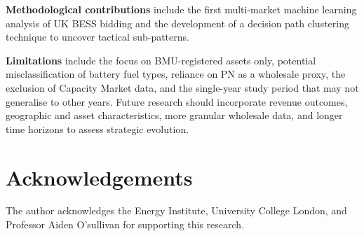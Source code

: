 \documentclass[12pt,a4paper]{article}
\begin{document}
\textbf{Methodological contributions} include the first multi-market machine learning analysis of UK BESS bidding and the development of a decision path clustering technique to uncover tactical sub-patterns.

\textbf{Limitations} include the focus on BMU-registered assets only, potential misclassification of battery fuel types, reliance on PN as a wholesale proxy, the exclusion of Capacity Market data, and the single-year study period that may not generalise to other years. Future research should incorporate revenue outcomes, geographic and asset characteristics, more granular wholesale data, and longer time horizons to assess strategic evolution.

\vspace{0.5cm}
\section*{Acknowledgements}
The author acknowledges the Energy Institute, University College London, and Professor Aiden O'sullivan for supporting this research.
\end{document}
